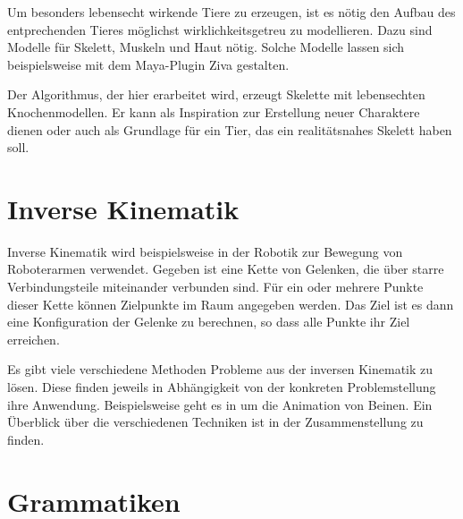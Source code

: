 Um besonders lebensecht wirkende Tiere zu erzeugen, ist es nötig den Aufbau des entprechenden Tieres möglichst wirklichkeitsgetreu zu modellieren. Dazu sind Modelle für Skelett, Muskeln und Haut nötig. Solche Modelle lassen sich beispielsweise mit dem Maya-Plugin Ziva \cite{Ziva} gestalten. \cite{ZivaGeneralSetup}

Der Algorithmus, der hier erarbeitet wird, erzeugt Skelette mit lebensechten Knochenmodellen. Er kann als Inspiration zur Erstellung neuer Charaktere dienen oder auch als Grundlage für ein Tier, das ein realitätsnahes Skelett haben soll.




\section{Inverse Kinematik}
\label{IK}

Inverse Kinematik wird beispielsweise in der Robotik zur Bewegung von Roboterarmen verwendet. Gegeben ist eine Kette von Gelenken, die über starre Verbindungsteile miteinander verbunden sind. Für ein oder mehrere Punkte dieser Kette können Zielpunkte im Raum angegeben werden. Das Ziel ist es dann eine Konfiguration der Gelenke zu berechnen, so dass alle Punkte ihr Ziel erreichen.

Es gibt viele verschiedene Methoden Probleme aus der inversen Kinematik zu lösen. Diese finden jeweils in Abhängigkeit von der konkreten Problemstellung ihre Anwendung. Beispielsweise geht es in \cite{IKLegs} um die Animation von Beinen. Ein Überblick über die verschiedenen Techniken ist in der Zusammenstellung \cite{IKSurvey} zu finden.



\section{Grammatiken}
\label{grammars}

